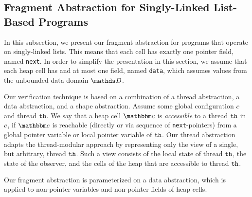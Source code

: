 \subsection{Fragment Abstraction for Singly-Linked List-Based Programs}


In this subsection, we present our fragment abstraction for programs that
operate on singly-linked lists. This means that
each cell has exactly one pointer field, named {\tt next}.
In order to simplify the presentation in this section, we assume that
each heap cell has and at most one field, named  {\tt data}, which
assumes values from the unbounded data domain $\ddomain$.

Our verification technique is based on a combination of a thread abstraction, a
data  abstraction, and a shape abstraction. 
Assume some global configuration $c$ and thread ${\tt th}$.
We say that a heap cell $\cell$ is {\em accessible} to a thread ${\tt th}$
in $c$,
if $\cell$ is reachable (directly or via sequence of
{\tt next}-pointers) from a global pointer variable or local pointer
variable of ${\tt th}$.
Our thread abstraction adapts the thread-modular approach by representing only the view of a single, but arbitrary, thread ${\tt th}$.
Such a view consists of
the local state of thread ${\tt th}$, the state of the observer, and
the cells of the heap that are accessible to thread ${\tt th}$.


Our fragment abstraction is parameterized on a data abstraction,
which is applied to non-pointer variables and non-pointer fields of heap cells.


